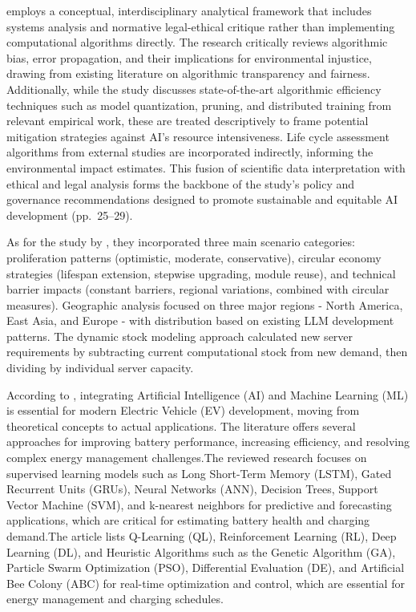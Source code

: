 \documentclass[a4paper, 12pt]{article}
\begin{document}
\par \citet{Zhuk2023} employs a conceptual, interdisciplinary analytical framework that includes systems analysis and normative legal-ethical critique rather than implementing computational algorithms directly. The research critically reviews algorithmic bias, error propagation, and their implications for environmental injustice, drawing from existing literature on algorithmic transparency and fairness. Additionally, while the study discusses state-of-the-art algorithmic efficiency techniques such as model quantization, pruning, and distributed training from relevant empirical work, these are treated descriptively to frame potential mitigation strategies against AI’s resource intensiveness. Life cycle assessment algorithms from external studies are incorporated indirectly, informing the environmental impact estimates. This fusion of scientific data interpretation with ethical and legal analysis forms the backbone of the study’s policy and governance recommendations designed to promote sustainable and equitable AI development (pp.~25--29). \hfill \break
\par As for the study by \citet{wang_2024_ewaste}, they incorporated three main scenario categories: proliferation patterns (optimistic, moderate, conservative), circular economy strategies (lifespan extension, stepwise upgrading, module reuse), and technical barrier impacts (constant barriers, regional variations, combined with circular measures). Geographic analysis focused on three major regions - North America, East Asia, and Europe - with distribution based on existing LLM development patterns. The dynamic stock modeling approach calculated new server requirements by subtracting current computational stock from new demand, then dividing by individual server capacity. \hfill \break
\par According to \citet{M.rauf2024}, integrating Artificial Intelligence (AI) and Machine Learning (ML) is essential for modern Electric Vehicle (EV) development, moving from theoretical concepts to actual applications.   The literature offers several approaches for improving battery performance, increasing efficiency, and resolving complex energy management challenges.The reviewed research focuses on supervised learning models such as Long Short-Term Memory (LSTM), Gated Recurrent Units (GRUs), Neural Networks (ANN), Decision Trees, Support Vector Machine (SVM), and k-nearest neighbors for predictive and forecasting applications, which are critical for estimating battery health and charging demand.The article lists Q-Learning (QL), Reinforcement Learning (RL), Deep Learning (DL), and Heuristic Algorithms such as the Genetic Algorithm (GA), Particle Swarm Optimization (PSO), Differential Evaluation (DE), and Artificial Bee Colony (ABC) for real-time optimization and control, which are essential for energy management and charging schedules.\hfill \break
\end{document}
